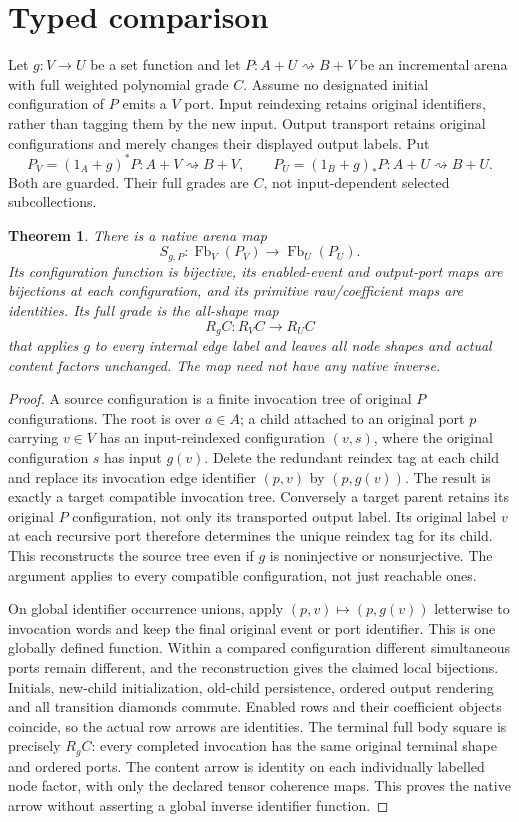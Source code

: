 \documentclass[11pt]{article}
\newtheorem{theorem}{Theorem}\newtheorem{proposition}{Proposition}
\begin{document}
\section{Typed comparison}
Let $g:V\to U$ be a set function and let $P:A+U\rightsquigarrow B+V$ be an incremental arena with full weighted polynomial grade $C$. Assume no designated initial configuration of $P$ emits a $V$ port. Input reindexing retains original identifiers, rather than tagging them by the new input. Output transport retains original configurations and merely changes their displayed output labels. Put
\[
 P_V=(1_A+g)^*P:A+V\rightsquigarrow B+V,
 \qquad P_U=(1_B+g)_*P:A+U\rightsquigarrow B+U.
\]
Both are guarded. Their full grades are $C$, not input-dependent selected subcollections.
\begin{theorem}
There is a native arena map
\[
 S_{g,P}:\operatorname{Fb}_V(P_V)\longrightarrow
          \operatorname{Fb}_U(P_U).\tag{S}
\]
Its configuration function is bijective, its enabled-event and output-port maps are bijections at each configuration, and its primitive raw/coefficient maps are identities. Its full grade is the all-shape map
\[
 R_g C:R_V C\longrightarrow R_U C
\]
that applies $g$ to every internal edge label and leaves all node shapes and actual content factors unchanged. The map need not have any native inverse.
\end{theorem}
\begin{proof}
A source configuration is a finite invocation tree of original $P$ configurations. The root is over $a\in A$; a child attached to an original port $p$ carrying $v\in V$ has an input-reindexed configuration $(v,s)$, where the original configuration $s$ has input $g(v)$. Delete the redundant reindex tag at each child and replace its invocation edge identifier $(p,v)$ by $(p,g(v))$. The result is exactly a target compatible invocation tree. Conversely a target parent retains its original $P$ configuration, not only its transported output label. Its original label $v$ at each recursive port therefore determines the unique reindex tag for its child. This reconstructs the source tree even if $g$ is noninjective or nonsurjective. The argument applies to every compatible configuration, not just reachable ones.

On global identifier occurrence unions, apply $(p,v)\mapsto(p,g(v))$ letterwise to invocation words and keep the final original event or port identifier. This is one globally defined function. Within a compared configuration different simultaneous ports remain different, and the reconstruction gives the claimed local bijections. Initials, new-child initialization, old-child persistence, ordered output rendering and all transition diamonds commute. Enabled rows and their coefficient objects coincide, so the actual row arrows are identities. The terminal full body square is precisely $R_g C$: every completed invocation has the same original terminal shape and ordered ports. The content arrow is identity on each individually labelled node factor, with only the declared tensor coherence maps. This proves the native arrow without asserting a global inverse identifier function.
\end{proof}
\end{document}
